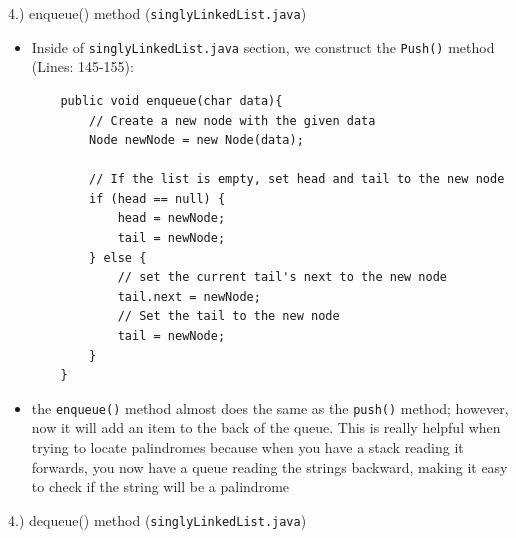 \documentclass[a4paper,12pt]{article}
\begin{document}
\begin{large}
    4.) enqueue() method (\verb|singlyLinkedList.java|)
\end{large}


\begin{itemize}
\item Inside of \verb|singlyLinkedList.java| section, we construct the \verb|Push()| method (Lines: 145-155):

\begin{verbatim}
    public void enqueue(char data){
        // Create a new node with the given data
        Node newNode = new Node(data);
    
        // If the list is empty, set head and tail to the new node
        if (head == null) {
            head = newNode;
            tail = newNode;
        } else {
            // set the current tail's next to the new node
            tail.next = newNode;
            // Set the tail to the new node
            tail = newNode;
        }
    }
\end{verbatim}
\item the \verb|enqueue()| method almost does the same as the \verb|push()| method; however, now it will add an item to the back of the queue. This is really helpful when trying to locate palindromes because when you have a stack reading it forwards, you now have a queue reading the strings backward, making it easy to check if the string will be a palindrome\\

\end{itemize}

\begin{large}
    4.) dequeue() method (\verb|singlyLinkedList.java|)
\end{large}
\end{document}
